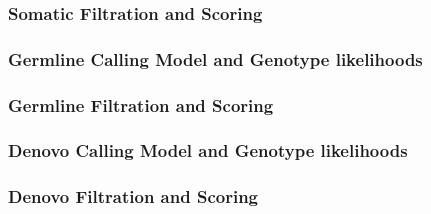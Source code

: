\documentclass{article}
\begin{document}
\subsubsection{Somatic Filtration and Scoring}

\subsubsection{Germline Calling Model and Genotype likelihoods}

\subsubsection{Germline Filtration and Scoring}

\subsubsection{Denovo Calling Model and Genotype likelihoods}

\subsubsection{Denovo Filtration and Scoring}



\end{document}
